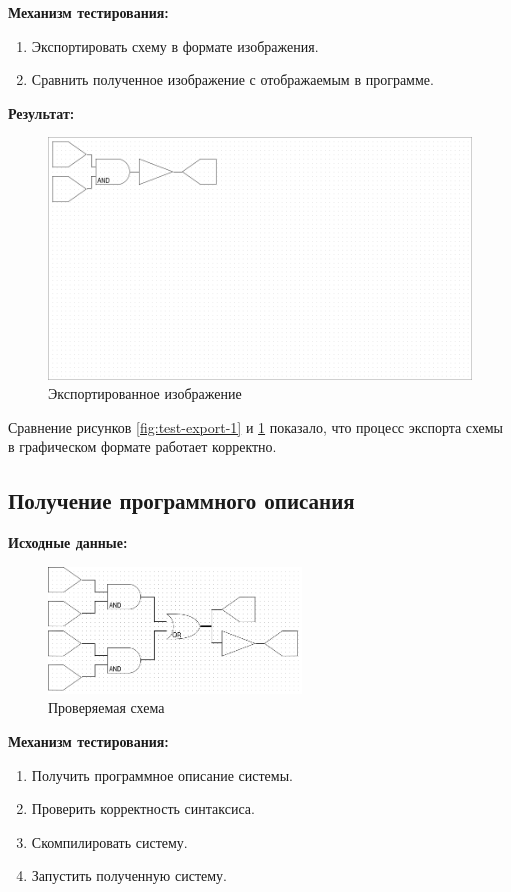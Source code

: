 \textbf{Механизм тестирования:}
\begin{enumerate}
  \item Экспортировать схему в формате изображения.
  \item Сравнить полученное изображение с отображаемым в программе.
\end{enumerate}

\textbf{Результат:}
\begin{figure}[H]
  \centering
  \includegraphics[width=1\textwidth]{gui/test/export-2.png}
  \caption{Экспортированное изображение}
  \label{fig:test-export-2}
\end{figure}

Сравнение рисунков \ref{fig:test-export-1} и \ref{fig:test-export-2} показало, что процесс экспорта схемы в графическом формате работает корректно.

\subsection{Получение программного описания}
\textbf{Исходные данные:}
\begin{figure}[H]
  \centering
  \includegraphics[width=0.6\textwidth]{gui/test/source.png}
  \caption{Проверяемая схема}
\end{figure}

\textbf{Механизм тестирования:}
\begin{enumerate}
  \item Получить программное описание системы.
  \item Проверить корректность синтаксиса.
  \item Скомпилировать систему.
  \item Запустить полученную систему.
\end{enumerate}

